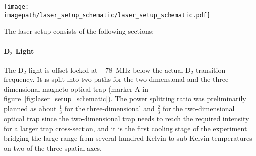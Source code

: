 \begin{sidewaysfigure}
    \centering
    \texttt{[image: \\imagepath/laser\_setup\_schematic/laser\_setup\_schematic.pdf]}
    \caption{Schematic of the laser setup for preparing the cooling light for the magneto-optical traps and the gray molasses: D$_2$ light is split into two branches for the two-dimensional (to the right) and the three-dimensional magneto-optical (to the bottom) traps (A).\\
    For the light for the two-dimensional trap, a small amount of power is taken out for the push beam (B) before it is split into cooler and repumper light (C) and frequency-shifted by \SI[]{+-114}{\mega\hertz} on acousto-optic modulators. It is then recombined (D) and split into two outputs (E). There is consideration to add an electro-optical modulator (EOM) for improving the cooling effect of the light. This part of the laser setup was constructed within the scope of this thesis (gray box).\\
    The light for the three-dimensional trap and the D$_1$ light for the gray molasses are spatially overlapped (F), split into cooler and repumper (G) and frequency-shifted by  \SI[]{+162}{\mega\hertz} and \SI[]{+390}{\mega\hertz} respectively on acousto-optic modulator double passes, recombined (H), and then split into three outputs (I).\\
    Small amounts of power of both input laser beams are split off for locking on offset locks. A small amount of light for the three-dimensional magneto-optical trap and the gray molasses is split off for monitoring the light frequencies on a cavity.\\
    HWP and QWP stand for half- and quarter-wave plate respectively. The numbers in \si[]{\milli\watt} next to the beam lines are target powers assuming optimally working laser sources.}
    \label{fig:laser_setup_schematic}
\end{sidewaysfigure}

The laser setup consists of the following sections:

\paragraph{D$_\textsf{2}$ Light} The D$_2$ light is offset-locked at \SI{-78}{\mega\hertz} below the actual D$_2$ transition frequency. It is split into two paths for the two-dimensional and the three-dimensional magneto-optical trap (marker A in figure~\ref{fig:laser_setup_schematic}). The power splitting ratio was preliminarily planned as about $\frac{1}{3}$ for the three-dimensional and $\frac{2}{3}$ for the two-dimensional optical trap since the two-dimensional trap needs to reach the required intensity for a larger trap cross-section, and it is the first cooling stage of the experiment bridging the large range from several hundred Kelvin to sub-Kelvin temperatures on two of the three spatial axes.


